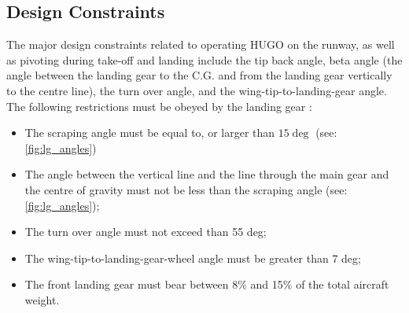 

\subsection{Design Constraints}
The major design constraints related to operating HUGO on the runway, as well as pivoting during take-off and landing include 
the tip back angle, beta angle (the angle between the landing gear to the C.G. and from the landing gear vertically to the centre line), the turn over angle, and the wing-tip-to-landing-gear angle. The following restrictions must be obeyed by the landing gear \cite{roskamLandingGearSystems,Vos}:
\begin{itemize}
    \item The scraping angle must be equal to, or larger than $15 \deg$ (see: \autoref{fig:lg_angles})
    \item The angle between the vertical line and the line through the main gear and the centre of gravity must not be less than the scraping angle (see: \autoref{fig:lg_angles});
    \item The turn over angle must not exceed than 55 deg;
    \item The wing-tip-to-landing-gear-wheel angle must be greater than 7 deg;
    \item The front landing gear must bear between 8\% and 15\% of the total aircraft weight.
\end{itemize}

